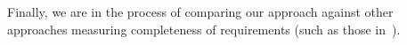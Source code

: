 Finally, we are in the process of 
comparing our approach against other approaches measuring completeness of 
requirements (such as those in~\cite{chockler_coverage_2003, Kupferman:2006:SCF, kupferman_theory_2008}).
%



